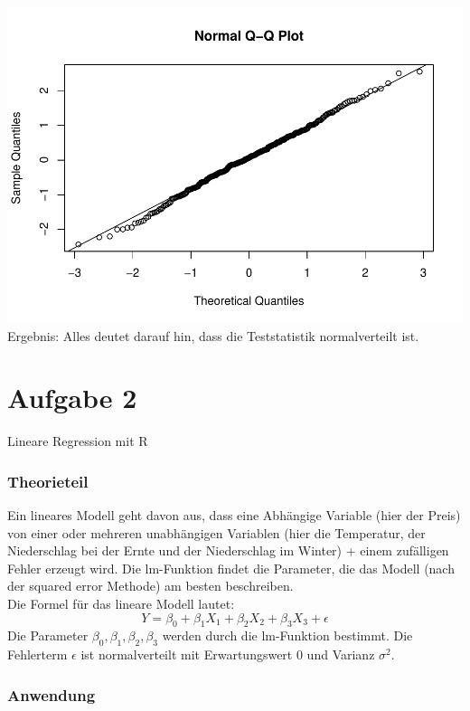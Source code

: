 \documentclass[]{article}
\begin{document}
\includegraphics{Test_files/figure-latex/unnamed-chunk-10-1.pdf}
Ergebnis: Alles deutet darauf hin, dass die Teststatistik normalverteilt ist.

\hypertarget{aufgabe-2}{%
\section{Aufgabe 2}\label{aufgabe-2}}

Lineare Regression mit R

\hypertarget{theorieteil-3}{%
\subsubsection{Theorieteil}\label{theorieteil-3}}

Ein lineares Modell geht davon aus, dass eine Abhängige Variable (hier der Preis) von einer oder mehreren
unabhängigen Variablen (hier die Temperatur, der Niederschlag bei der Ernte und der Niederschlag im Winter) +
einem zufälligen Fehler erzeugt wird. Die lm-Funktion findet die Parameter, die das Modell
(nach der squared error Methode) am besten beschreiben.\\
Die Formel für das lineare Modell lautet:
\[
Y = \beta_0 + \beta_1 X_1 + \beta_2 X_2 + \beta_3 X_3 + \epsilon
\]
Die Parameter \(\beta_0, \beta_1, \beta_2, \beta_3\) werden durch die lm-Funktion bestimmt.
Die Fehlerterm \(\epsilon\) ist normalverteilt mit Erwartungswert 0 und Varianz \(\sigma^2\).

\hypertarget{anwendung-3}{%
\subsubsection{Anwendung}\label{anwendung-3}}
\end{document}
